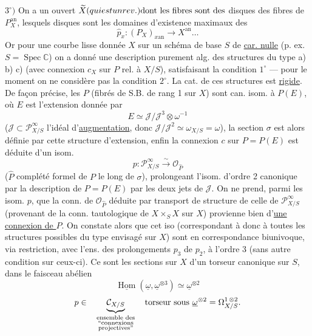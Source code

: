 $3^\circ)$ On a un ouvert $\widetilde X{{(qui est un rev.)}}{\text{dont les fibres sont des}}$ disques des fibres de $P_X^{\mathrm{an}}$, lesquels disques sont les domaines d'existence maximaux des
\[\widehat p_x:(P_X)_{x\mathrm{an}}\longrightarrow X^{\mathrm{an}}\ldots\]
Or pour une courbe lisse donnée $X$ sur un schéma de base $S$ de \uline{car. nulle} (p. ex. $S=\operatorname{Spec}\mathbb C$) on a donné une description purement alg. des structures du type a) b) c) (avec connexion $c_X$ sur $P$ rel. à $X/S$), satisfaisant la condition $1^\circ$ --- pour le moment on ne considère pas la condition $2^\circ$. La cat. de ces structures est \uline{rigide}.
De façon précise, les $P$ (fibrés de S.B. de rang 1 sur $X$) sont can. isom. à $P(E)$, où $E$ est l'extension
donnée par
\[E\simeq\mathcal J/\mathcal J^3\otimes\omega^{-1}\]
($\mathcal J\subset\mathcal P^\infty_{X/S}$ l'idéal d'\uline{augmentation}, donc $\mathcal J/\mathcal J^2\simeq\omega_{X/S}=\omega$), la section $\sigma$ est alors définie par cette structure d'extension, enfin la connexion $c$ sur $P=P(E)$ est déduite d'un isom.
\[p:\mathcal P^\infty_{X/S}\xrightarrow{\sim}\mathcal O_{\widehat P}\]
($\widehat P$ complété formel de $P$ le long de $\sigma$), prolongeant l'isom. d'ordre 2 canonique   par la description de $P=P(E)$ par les deux  jets de $\mathcal J$. On ne prend, parmi les isom. $p$, que la conn. de $\mathcal O_{\widehat P}$ déduite par transport de structure de celle de $\mathcal P^\infty_{X/S}$ (provenant de la conn. tautologique de $X\times_S X$ sur $X$) provienne bien d'\uline{une connexion de $P$}. On constate alors que cet iso (correspondant à
donc à toutes les structures possibles du type envisagé sur $X$) sont en correspondance biunivoque, via restriction, avec l'ens. des prolongements $p_3$ de $p_2$, à l'ordre 3 (sans autre condition sur ceux-ci).
Ce sont  les sections sur $X$ d'un torseur canonique sur $S$, dans le faisceau abélien
\[\underline{\operatorname{Hom}}(\underline\omega,\underline\omega^{\otimes3})\simeq\underline\omega^{\otimes2}\]
\[
{{p\in}}\quad\underbrace{\mathcal C_{X/S}}_{\substack{\text{ensemble des}\\\text{``connexions}\\\text{projectives''}}}\quad\text{torseur sous }\underline\omega^{\otimes2}=\Omega^{1\,\otimes2}_{X/S}.
\]
